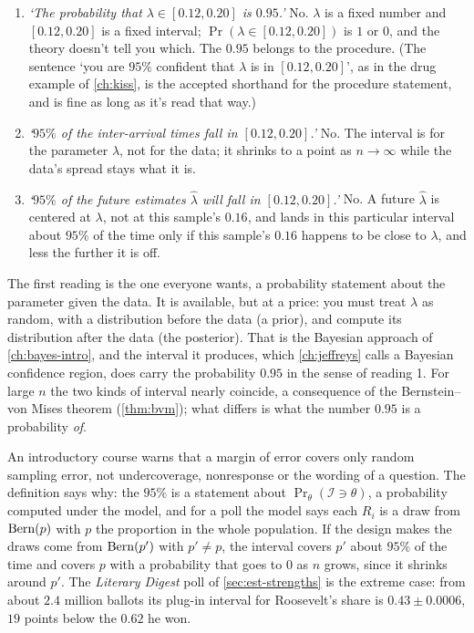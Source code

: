 \begin{pitfall}
\begin{enumerate}[nosep]
\item \textit{`The probability that $\lambda \in [0.12, 0.20]$ is $0.95$.'} No. $\lambda$ is a fixed number and $[0.12, 0.20]$ is a fixed interval; $\Pr(\lambda \in [0.12, 0.20])$ is $1$ or $0$, and the theory doesn't tell you which. The $0.95$ belongs to the procedure. (The sentence `you are $95\%$ confident that $\lambda$ is in $[0.12, 0.20]$', as in the drug example of \cref{ch:kiss}, is the accepted shorthand for the procedure statement, and is fine as long as it's read that way.)
\item \textit{`$95\%$ of the inter-arrival times fall in $[0.12, 0.20]$.'} No. The interval is for the parameter $\lambda$, not for the data; it shrinks to a point as $n \to \infty$ while the data's spread stays what it is.
\item \textit{`$95\%$ of the future estimates $\hat{\lambda}$ will fall in $[0.12, 0.20]$.'} No. A future $\hat{\lambda}$ is centered at $\lambda$, not at this sample's $0.16$, and lands in this particular interval about $95\%$ of the time only if this sample's $0.16$ happens to be close to $\lambda$, and less the further it is off.
\end{enumerate}
\end{pitfall}

The first reading is the one everyone wants, a probability statement about the parameter given the data.
It is available, but at a price: you must treat $\lambda$ as random, with a distribution before the data (a prior), and compute its distribution after the data (the posterior).
That is the Bayesian approach of \cref{ch:bayes-intro}, and the interval it produces, which \cref{ch:jeffreys} calls a Bayesian confidence region, does carry the probability $0.95$ in the sense of reading 1.
For large $n$ the two kinds of interval nearly coincide, a consequence of the Bernstein--von Mises theorem (\cref{thm:bvm}); what differs is what the number $0.95$ is a probability \textit{of}.

\begin{bridge}
An introductory course warns that a margin of error covers only random sampling error, not undercoverage, nonresponse or the wording of a question.
The definition says why: the $95\%$ is a statement about $\Pr_\theta(\mathcal{I} \ni \theta)$, a probability computed under the model, and for a poll the model says each $R_i$ is a draw from $\text{Bern}(p)$ with $p$ the proportion in the whole population.
If the design makes the draws come from $\text{Bern}(p')$ with $p' \neq p$, the interval covers $p'$ about $95\%$ of the time and covers $p$ with a probability that goes to $0$ as $n$ grows, since it shrinks around $p'$.
The \textit{Literary Digest} poll of \cref{sec:est-strengths} is the extreme case: from about $2.4$ million ballots its plug-in interval for Roosevelt's share is $0.43 \pm 0.0006$, $19$ points below the $0.62$ he won.
\end{bridge}

